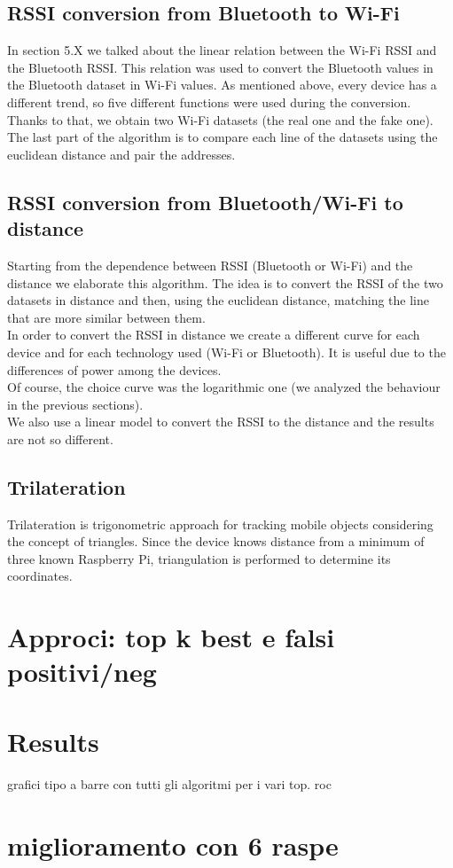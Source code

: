 \subsection{RSSI conversion from Bluetooth to Wi-Fi}
In section 5.X we talked about the linear relation between the Wi-Fi RSSI and the Bluetooth RSSI. This relation was used to convert the Bluetooth values in the Bluetooth dataset in Wi-Fi values. As mentioned above, every device has a different trend, so five different functions were used during the conversion.\\
Thanks to that, we obtain two Wi-Fi datasets (the real one and the fake one). The last part of the algorithm is to compare each line of the datasets using the euclidean distance and pair the addresses.

\subsection{RSSI conversion from Bluetooth/Wi-Fi to distance}
Starting from the dependence between RSSI (Bluetooth or Wi-Fi) and the distance we elaborate this algorithm. The idea is to convert the RSSI of the two datasets in distance and then, using the euclidean distance, matching the line that are more similar between them.\\
\linebreak
In order to convert the RSSI in distance we create a different curve for each device and for each technology used (Wi-Fi or Bluetooth). It is useful due to the differences of power among the devices.\\
\linebreak
Of course, the choice curve was the logarithmic one (we analyzed the behaviour in the previous sections).\\
We also use a linear model to convert the RSSI to the distance and the results are not so different.

\subsection{Trilateration}
Trilateration is trigonometric approach for tracking mobile objects considering the concept of triangles. Since the device knows distance from a minimum of three known Raspberry Pi, triangulation is performed to determine its coordinates.\\


\section{Approci: top k best e falsi positivi/neg	}


\section{Results}
grafici tipo a barre con tutti gli algoritmi per i vari top.
roc

\section{miglioramento con 6 raspe}
